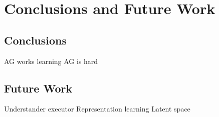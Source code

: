 \chapter{Conclusions and Future Work}%

\section{Conclusions}
AG works
learning AG is hard



\section{Future Work}
Understander executor
Representation learning
Latent space